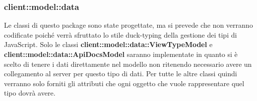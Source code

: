 %

%

\subsubsection{client::model::data} %
\label{ssub:bdsm_app_client_model_data}
Le classi di questo package sono state progettate, ma si prevede che non verranno codificate poiché verrà sfruttato lo stile duck-typing della gestione dei tipi di JavaScript. Solo le classi \textbf{client::model::data::ViewTypeModel} e \textbf{client::model::data::ApiDocsModel} saranno implementate in quanto si è scelto di tenere i dati direttamente nel modello non ritenendo necessario avere un collegamento al server per questo tipo di dati. \newline
Per tutte le altre classi quindi verranno solo forniti gli attributi che ogni oggetto che vuole rappresentare quel tipo dovrà avere.


